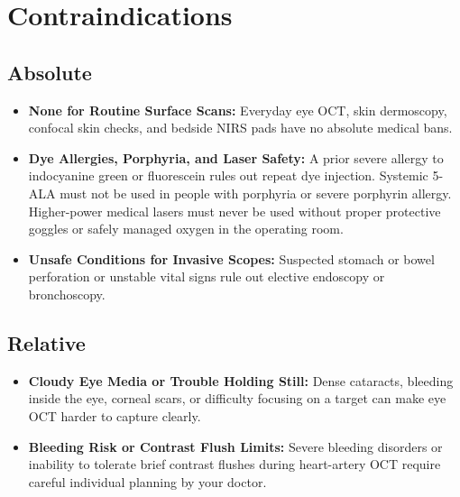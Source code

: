 \section{Contraindications}

\subsection{Absolute}
\begin{itemize}
  \item \textbf{None for Routine Surface Scans:} Everyday eye OCT, skin dermoscopy, confocal skin checks, and bedside NIRS pads have no absolute medical bans.
  \item \textbf{Dye Allergies, Porphyria, and Laser Safety:} A prior severe allergy to indocyanine green or fluorescein rules out repeat dye injection. Systemic 5-ALA must not be used in people with porphyria or severe porphyrin allergy. Higher-power medical lasers must never be used without proper protective goggles or safely managed oxygen in the operating room.
  \item \textbf{Unsafe Conditions for Invasive Scopes:} Suspected stomach or bowel perforation or unstable vital signs rule out elective endoscopy or bronchoscopy.
\end{itemize}

\subsection{Relative}
\begin{itemize}
  \item \textbf{Cloudy Eye Media or Trouble Holding Still:} Dense cataracts, bleeding inside the eye, corneal scars, or difficulty focusing on a target can make eye OCT harder to capture clearly.
  \item \textbf{Bleeding Risk or Contrast Flush Limits:} Severe bleeding disorders or inability to tolerate brief contrast flushes during heart-artery OCT require careful individual planning by your doctor.
\end{itemize}

